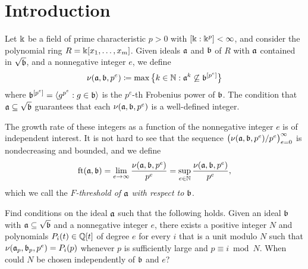 \documentclass[11pt]{amsart}
\begin{document}
\newpage
\section{Introduction}

Let $\Bbbk$ be a field of prime characteristic $p>0$ with $[\Bbbk:\Bbbk^p] < \infty$, and consider the polynomial ring $R = \Bbbk[x_1, \ldots, x_m]$.  Given ideals $\mathfrak{a}$ and $\mathfrak{b}$ of $R$ with ${\mathfrak{a}}$ contained in $\sqrt {\mathfrak{b}}$, and a nonnegative integer $e$, we define
%
\[\nu(\mathfrak{a},\mathfrak{b},p^e) \coloneqq \max\big\{k\in \mathbb{N} : \mathfrak{a}^{k} \not\subseteq \mathfrak{b}^{[p^e]}\big\}\]
%
where $\mathfrak{b}^{[p^e]} = \langle g^{p^e} : g \in \mathfrak{b} \rangle$ is the $p^e$-th Frobenius power of $\mathfrak{b}$.
The condition that $\mathfrak{a} \subseteq \sqrt {\mathfrak{b}}$ guarantees that each $\nu(\mathfrak{a}, \mathfrak{b}, p^e)$ is a well-defined integer.

The growth rate of these integers as a function of the nonnegative integer $e$ is of independent interest.
It is not hard to see that the sequence $\big(\nu(\mathfrak{a},\mathfrak{b},p^e)/p^e\big)_{e=0}^{\infty}$ is nondecreasing and bounded,  and we define
\[ \operatorname{ft}(\mathfrak{a}, \mathfrak{b}) = \lim_{e \to \infty} \frac{\nu(\mathfrak{a}, \mathfrak{b}, p^e)}{p^e}  = \sup_{e\in \mathbb{N}} \frac{\nu(\mathfrak{a},\mathfrak{b},p^e)}{p^e}, \]
which we call the \emph{$F$-threshold of $\mathfrak{a}$ with respect to $\mathfrak{b}$}.




\begin{problem}
   Find conditions on the ideal $\mathfrak{a}$ such that the following holds.
   Given an ideal $\mathfrak{b}$ with $\mathfrak{a} \subseteq \sqrt {\mathfrak{b}}$ and a nonnegative integer $e$, there exists a positive integer $N$ and polynomials $P_i(t) \in \mathbb{Q}[t]$ of degree $e$ for every $i$ that is a unit modulo $N$ such that $\nu(\mathfrak{a}_p, \mathfrak{b}_p, p^e) = P_i(p)$ whenever $p$ is sufficiently large and $p \equiv i \bmod N$.
   When could $N$ be chosen independently of $\mathfrak{b}$ and $e$?
\end{problem}
\end{document}
